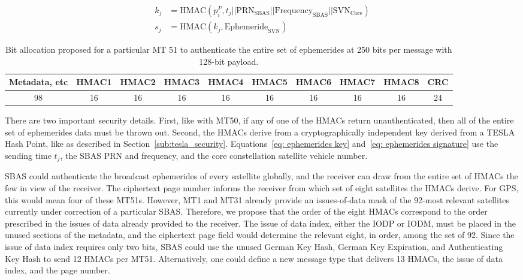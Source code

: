 \documentclass[letterpaper,times]{IONconf/IONconf}
\begin{document}
		\begin{align}
			k_j &= \textrm{HMAC}(p^P_i, t_j || \textrm{PRN}_\textrm{SBAS} || \textrm{Frequency}_\textrm{SBAS} || \textrm{SVN}_\textrm{Core} \label{eq: ephemerides key}) \\
			s_j &= \textrm{HMAC}(k_j, \textrm{Ephemeride}_{\textrm{SVN}}) \label{eq: ephemerides signature}
		\end{align}

		\begin{table}
			\center
			\begin{tabular}{|c|c|c|c|c|c|c|c|c|c|} \hline
				Metadata, etc & HMAC1 & HMAC2 & HMAC3 & HMAC4 & HMAC5 & HMAC6 & HMAC7 & HMAC8 & CRC \\ \hline
				98 & 16 & 16 & 16 & 16& 16 & 16 & 16 & 16 & 24 \\ \hline
			\end{tabular}
			\caption{Bit allocation proposed for a particular MT 51 to authenticate the entire set of ephemerides at 250 bits per message with 128-bit payload.}
			\label{tab: nma}
		\end{table}

		There are two important security details.
		First, like with MT50, if any of one of the HMACs return unauthenticated, then all of the entire set of ephemerides data must be thrown out.
		Second, the HMACs derive from a cryptographically independent key derived from a TESLA Hash Point, like as described in Section~\ref{sub:tesla_security}.
		Equations~\eqref{eq: ephemerides key} and~\eqref{eq: ephemerides signature} use the sending time $t_j$, the SBAS PRN and frequency, and the core constellation satellite vehicle number.

		SBAS could authenticate the broadcast ephemerides of every satellite globally, and the receiver can draw from the entire set of HMACs the few in view of the receiver.
		The ciphertext page number informs the receiver from which set of eight satellites the HMACs derive.
		For GPS, this would mean four of these MT51s.
		However, MT1 and MT31 already provide an issues-of-data mask of the 92-most relevant satellites currently under correction of a particular SBAS.
		Therefore, we propose that the order of the eight HMACs correspond to the order prescribed in the issues of data already provided to the receiver.
		The issue of data index, either the IODP or IODM, must be placed in the unused sections of the metadata, and the ciphertext page field would determine the relevant eight, in order, among the set of 92.
		Since the issue of data index requires only two bits, SBAS could use the unused German Key Hash, German Key Expiration, and Authenticating Key Hash to send 12 HMACs per MT51.
		Alternatively, one could define a new message type that delivers 13 HMACs, the issue of data index, and the page number.
\end{document}
